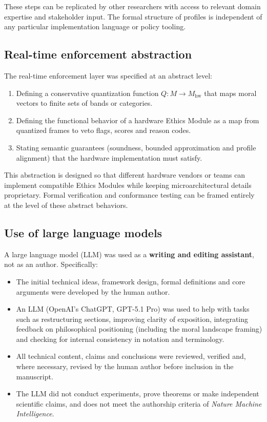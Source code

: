 \documentclass[11pt]{article}
\begin{document}
These steps can be replicated by other researchers with access to relevant domain expertise and stakeholder input. The formal structure of profiles is independent of any particular implementation language or policy tooling.

\subsection*{Real-time enforcement abstraction}

The real-time enforcement layer was specified at an abstract level:

\begin{enumerate}
  \item Defining a conservative quantization function $Q \colon M \to M_{\mathrm{hw}}$ that maps moral vectors to finite sets of bands or categories.
  \item Defining the functional behavior of a hardware Ethics Module as a map from quantized frames to veto flags, scores and reason codes.
  \item Stating semantic guarantees (soundness, bounded approximation and profile alignment) that the hardware implementation must satisfy.
\end{enumerate}

This abstraction is designed so that different hardware vendors or teams can implement compatible Ethics Modules while keeping microarchitectural details proprietary. Formal verification and conformance testing can be framed entirely at the level of these abstract behaviors.

\subsection*{Use of large language models}

A large language model (LLM) was used as a \textbf{writing and editing assistant}, not as an author. Specifically:

\begin{itemize}
  \item The initial technical ideas, framework design, formal definitions and core arguments were developed by the human author.
  \item An LLM (OpenAI's ChatGPT, GPT-5.1 Pro) was used to help with tasks such as restructuring sections, improving clarity of exposition, integrating feedback on philosophical positioning (including the moral landscape framing) and checking for internal consistency in notation and terminology.
  \item All technical content, claims and conclusions were reviewed, verified and, where necessary, revised by the human author before inclusion in the manuscript.
  \item The LLM did not conduct experiments, prove theorems or make independent scientific claims, and does not meet the authorship criteria of \emph{Nature Machine Intelligence}.
\end{itemize}
\end{document}

